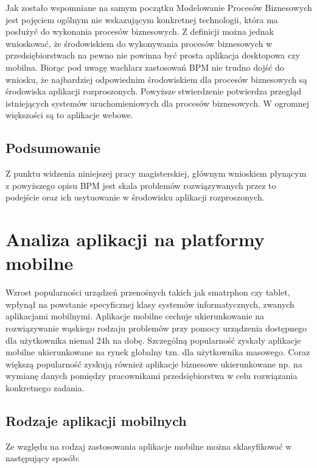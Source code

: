 Jak zostało wspomniane na samym początku Modelowanie Procesów Biznesowych jest pojęciem ogólnym nie wskazującym konkretnej technologii, która ma posłużyć do wykonania procesów biznesowych. Z definicji można jednak wnioskować, że środowiskiem do wykonywania procesów biznesowych w przedsiębiorstwach na pewno nie powinna być prosta aplikacja desktopowa czy mobilna. Biorąc pod uwagę wachlarz zastosowań BPM nie trudno dojść do wniosku, że najbardziej odpowiednim środowiskiem dla procesów biznesowych są środowiska aplikacji rozproszonych. 
Powyższe stwierdzenie potwierdza przegląd istniejących systemów uruchomieniowych dla procesów biznesowych. W ogromnej większości są to aplikacje webowe. 

\subsection{Podsumowanie}
\label{sec:podsumowanieBPM}

Z punktu widzenia niniejszej pracy magisterskiej, głównym wnioskiem płynącym z powyższego opisu BPM jest skala problemów rozwiązywanych przez to podejście oraz ich usytuowanie w środowisku aplikacji rozproszonych. 

\section{Analiza aplikacji na platformy mobilne}
\label{sec:analizaAplikacjiMobilnych}

Wzrost popularności urządzeń przenośnych takich jak smatrphon czy tablet, wpłynął na powstanie specyficznej klasy systemów informatycznych, zwanych aplikacjami mobilnymi. Aplikacje mobilne cechuje ukierunkowanie na rozwiązywanie wąskiego rodzaju problemów przy pomocy urządzenia dostępnego dla użytkownika niemal 24h na dobę. Szczególną popularność zyskały aplikacje mobilne ukierunkowane na rynek globalny tzn. dla użytkownika masowego. Coraz większą popularność zyskują również aplikacje biznesowe ukierunkowane np. na wymianę danych pomiędzy pracownikami przedsiębiorstwa w celu rozwiązania konkretnego zadania. 

\subsection{Rodzaje aplikacji mobilnych}
\label{sec:rodzajeAplikacjiMobilnych}

Ze względu na rodzaj zastosowania aplikacje mobilne można sklasyfikować w następujący sposób:


